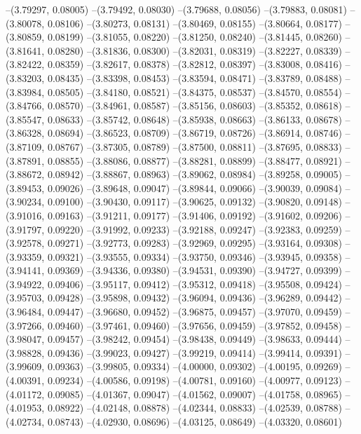 --(3.79297, 0.08005)
--(3.79492, 0.08030)
--(3.79688, 0.08056)
--(3.79883, 0.08081)
--(3.80078, 0.08106)
--(3.80273, 0.08131)
--(3.80469, 0.08155)
--(3.80664, 0.08177)
--(3.80859, 0.08199)
--(3.81055, 0.08220)
--(3.81250, 0.08240)
--(3.81445, 0.08260)
--(3.81641, 0.08280)
--(3.81836, 0.08300)
--(3.82031, 0.08319)
--(3.82227, 0.08339)
--(3.82422, 0.08359)
--(3.82617, 0.08378)
--(3.82812, 0.08397)
--(3.83008, 0.08416)
--(3.83203, 0.08435)
--(3.83398, 0.08453)
--(3.83594, 0.08471)
--(3.83789, 0.08488)
--(3.83984, 0.08505)
--(3.84180, 0.08521)
--(3.84375, 0.08537)
--(3.84570, 0.08554)
--(3.84766, 0.08570)
--(3.84961, 0.08587)
--(3.85156, 0.08603)
--(3.85352, 0.08618)
--(3.85547, 0.08633)
--(3.85742, 0.08648)
--(3.85938, 0.08663)
--(3.86133, 0.08678)
--(3.86328, 0.08694)
--(3.86523, 0.08709)
--(3.86719, 0.08726)
--(3.86914, 0.08746)
--(3.87109, 0.08767)
--(3.87305, 0.08789)
--(3.87500, 0.08811)
--(3.87695, 0.08833)
--(3.87891, 0.08855)
--(3.88086, 0.08877)
--(3.88281, 0.08899)
--(3.88477, 0.08921)
--(3.88672, 0.08942)
--(3.88867, 0.08963)
--(3.89062, 0.08984)
--(3.89258, 0.09005)
--(3.89453, 0.09026)
--(3.89648, 0.09047)
--(3.89844, 0.09066)
--(3.90039, 0.09084)
--(3.90234, 0.09100)
--(3.90430, 0.09117)
--(3.90625, 0.09132)
--(3.90820, 0.09148)
--(3.91016, 0.09163)
--(3.91211, 0.09177)
--(3.91406, 0.09192)
--(3.91602, 0.09206)
--(3.91797, 0.09220)
--(3.91992, 0.09233)
--(3.92188, 0.09247)
--(3.92383, 0.09259)
--(3.92578, 0.09271)
--(3.92773, 0.09283)
--(3.92969, 0.09295)
--(3.93164, 0.09308)
--(3.93359, 0.09321)
--(3.93555, 0.09334)
--(3.93750, 0.09346)
--(3.93945, 0.09358)
--(3.94141, 0.09369)
--(3.94336, 0.09380)
--(3.94531, 0.09390)
--(3.94727, 0.09399)
--(3.94922, 0.09406)
--(3.95117, 0.09412)
--(3.95312, 0.09418)
--(3.95508, 0.09424)
--(3.95703, 0.09428)
--(3.95898, 0.09432)
--(3.96094, 0.09436)
--(3.96289, 0.09442)
--(3.96484, 0.09447)
--(3.96680, 0.09452)
--(3.96875, 0.09457)
--(3.97070, 0.09459)
--(3.97266, 0.09460)
--(3.97461, 0.09460)
--(3.97656, 0.09459)
--(3.97852, 0.09458)
--(3.98047, 0.09457)
--(3.98242, 0.09454)
--(3.98438, 0.09449)
--(3.98633, 0.09444)
--(3.98828, 0.09436)
--(3.99023, 0.09427)
--(3.99219, 0.09414)
--(3.99414, 0.09391)
--(3.99609, 0.09363)
--(3.99805, 0.09334)
--(4.00000, 0.09302)
--(4.00195, 0.09269)
--(4.00391, 0.09234)
--(4.00586, 0.09198)
--(4.00781, 0.09160)
--(4.00977, 0.09123)
--(4.01172, 0.09085)
--(4.01367, 0.09047)
--(4.01562, 0.09007)
--(4.01758, 0.08965)
--(4.01953, 0.08922)
--(4.02148, 0.08878)
--(4.02344, 0.08833)
--(4.02539, 0.08788)
--(4.02734, 0.08743)
--(4.02930, 0.08696)
--(4.03125, 0.08649)
--(4.03320, 0.08601)
